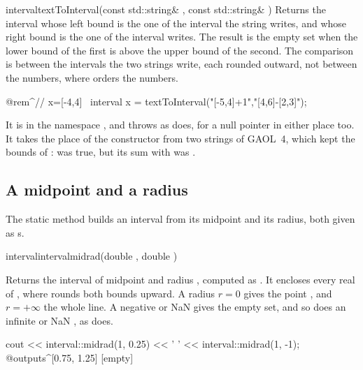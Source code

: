 \documentclass[12pt,a4paper,twoside,openright]{book}
\begin{document}
\begin{deffun}{interval}{textToInterval}{(const std::string\& , const std::string\& )}
  Returns the interval whose left bound is the one of the interval the string
   writes, and whose right bound is the one of the interval 
  writes. The result is the empty set when the lower bound of the first is
  above the upper bound of the second. The comparison is between the
  intervals the two strings write, each rounded outward, not between the
  numbers, where  orders the numbers.
  \begin{example}
 @rem^// x=[-4,4]~
 interval x = textToInterval("[-5,4]+1","[4,6]-[2,3]");
  \end{example}
  It is in the namespace , and throws 
  as  does, for a null pointer in either place
  too. It takes the place of the constructor from two strings of GAOL~4, which
  kept the bounds  of : 
  was true, but its sum with  was .\newinvfive
\end{deffun}

\subsection{A midpoint and a radius}

The static method  builds an interval from its
midpoint and its radius, both given as s.

\begin{defstaticmethod}{interval}{interval}{midrad}{(double , double )}
  \begin{operation}
  \end{operation}
  Returns the interval of midpoint  and radius , computed as
  . It encloses every
  real of , where  rounds both bounds upward. A radius $r=0$ gives the point ,
  and $r=+\infty$ the whole line. A negative or NaN  gives the empty
  set, and so does an infinite or NaN , as 
  does.\newinvfive
  \begin{example}
cout << interval::midrad(1, 0.25) << ' '
     << interval::midrad(1, -1);
@outputs^[0.75, 1.25] [empty]~
  \end{example}
\end{defstaticmethod}
\end{document}
